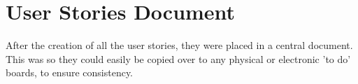\chapter{User Stories Document}
After the creation of all the user stories, they were placed in a central document. This was so they could easily be copied over to any physical or electronic 'to do' boards, to ensure consistency.

